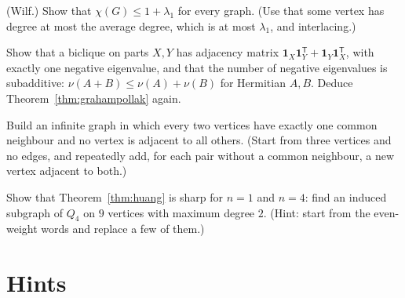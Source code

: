 \begin{exercise}[$\star\star$]\label{ex:wilf}
(Wilf.) Show that $\chi(G)\le1+\lambda_1$ for every graph. (Use that some vertex has degree at most the average degree, which is at
most $\lambda_1$, and interlacing.)
\end{exercise}

\begin{exercise}[$\star\star\star$]\label{ex:inertia}
Show that a biclique on parts $X,Y$ has adjacency matrix $\mathbf 1_X\mathbf 1_Y^{\mathsf T}+\mathbf 1_Y\mathbf 1_X^{\mathsf T}$, with exactly
one negative eigenvalue, and that the number of negative eigenvalues is subadditive: $\nu(A+B)\le\nu(A)+\nu(B)$ for Hermitian $A,B$.
Deduce Theorem~\ref{thm:grahampollak} again.
\end{exercise}

\begin{exercise}[$\star\star$]\label{ex:infinitefriends}
Build an infinite graph in which every two vertices have exactly one common neighbour and no vertex is adjacent to all others.
(Start from three vertices and no edges, and repeatedly add, for each pair without a common neighbour, a new vertex adjacent to both.)
\end{exercise}

\begin{exercise}[$\star\star$]\label{ex:huangsharp}
Show that Theorem~\ref{thm:huang} is sharp for $n=1$ and $n=4$: find an induced subgraph of $Q_4$ on $9$ vertices with maximum
degree $2$. (Hint: start from the even-weight words and replace a few of them.)
\end{exercise}

\section{Hints}

